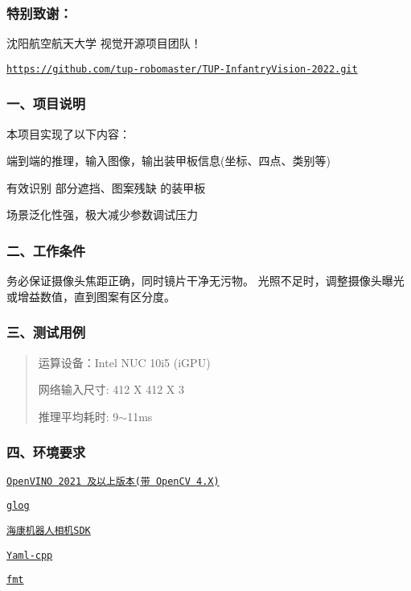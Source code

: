 \subsubsection*{特别致谢：}

{\ttfamily 沈阳航空航天大学} 视觉开源项目团队！

\href{https://github.com/tup-robomaster/TUP-InfantryVision-2022.git}{\tt https\+://github.\+com/tup-\/robomaster/\+T\+U\+P-\/\+Infantry\+Vision-\/2022.\+git}

\subsubsection*{一、项目说明}

本项目实现了以下内容：
\begin{DoxyItemize}
\item 端到端的推理，输入图像，输出装甲板信息(坐标、四点、类别等)
\item 有效识别 部分遮挡、图案残缺 的装甲板
\item 场景泛化性强，极大减少参数调试压力
\end{DoxyItemize}



\subsubsection*{二、工作条件}

务必保证摄像头焦距正确，同时镜片干净无污物。 光照不足时，调整摄像头曝光或增益数值，直到图案有区分度。

\subsubsection*{三、测试用例}

\begin{quote}
运算设备：\+Intel N\+UC 10i5 (i\+G\+PU)

网络输入尺寸\+: 412 X 412 X 3

推理平均耗时\+: 9$\sim$11ms \end{quote}


\subsubsection*{四、环境要求}


\begin{DoxyItemize}
\item \href{https://docs.openvino.ai/cn/latest/get_started.html}{\tt Open\+V\+I\+NO 2021 及以上版本(带 Open\+CV 4.\+X)}
\item \href{https://github.com/google/glog/releases/tag/v0.5.0}{\tt glog}
\item \href{https://www.hikrobotics.com/cn/machinevision/service/download}{\tt 海康机器人相机\+S\+DK}
\item \href{https://github.com/jbeder/yaml-cpp}{\tt Yaml-\/cpp}
\item \href{https://github.com/fmtlib/fmt}{\tt fmt} 
\end{DoxyItemize}